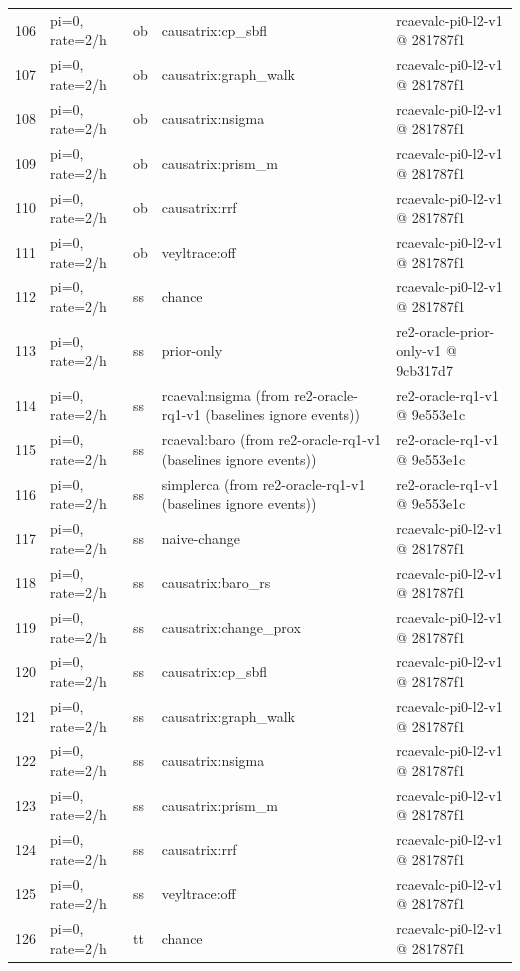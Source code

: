 \begin{longtable}{@{}r>{\raggedright\arraybackslash}p{48.0pt}>{\raggedright\arraybackslash}p{18.0pt}>{\raggedright\arraybackslash}p{108.0pt}>{\raggedright\arraybackslash}p{105.0pt}@{}}
106 & pi=0, rate=2/h & ob & causatrix:cp\_sbfl & rcaevalc-pi0-l2-v1 @ 281787f1 \\
107 & pi=0, rate=2/h & ob & causatrix:graph\_walk & rcaevalc-pi0-l2-v1 @ 281787f1 \\
108 & pi=0, rate=2/h & ob & causatrix:nsigma & rcaevalc-pi0-l2-v1 @ 281787f1 \\
109 & pi=0, rate=2/h & ob & causatrix:prism\_m & rcaevalc-pi0-l2-v1 @ 281787f1 \\
110 & pi=0, rate=2/h & ob & causatrix:rrf & rcaevalc-pi0-l2-v1 @ 281787f1 \\
111 & pi=0, rate=2/h & ob & veyltrace:off & rcaevalc-pi0-l2-v1 @ 281787f1 \\
112 & pi=0, rate=2/h & ss & chance & rcaevalc-pi0-l2-v1 @ 281787f1 \\
113 & pi=0, rate=2/h & ss & prior-only & re2-oracle-prior-only-v1 @ 9cb317d7 \\
114 & pi=0, rate=2/h & ss & rcaeval:nsigma (from re2-oracle-rq1-v1 (baselines ignore events)) & re2-oracle-rq1-v1 @ 9e553e1c \\
115 & pi=0, rate=2/h & ss & rcaeval:baro (from re2-oracle-rq1-v1 (baselines ignore events)) & re2-oracle-rq1-v1 @ 9e553e1c \\
116 & pi=0, rate=2/h & ss & simplerca (from re2-oracle-rq1-v1 (baselines ignore events)) & re2-oracle-rq1-v1 @ 9e553e1c \\
117 & pi=0, rate=2/h & ss & naive-change & rcaevalc-pi0-l2-v1 @ 281787f1 \\
118 & pi=0, rate=2/h & ss & causatrix:baro\_rs & rcaevalc-pi0-l2-v1 @ 281787f1 \\
119 & pi=0, rate=2/h & ss & causatrix:change\_prox & rcaevalc-pi0-l2-v1 @ 281787f1 \\
120 & pi=0, rate=2/h & ss & causatrix:cp\_sbfl & rcaevalc-pi0-l2-v1 @ 281787f1 \\
121 & pi=0, rate=2/h & ss & causatrix:graph\_walk & rcaevalc-pi0-l2-v1 @ 281787f1 \\
122 & pi=0, rate=2/h & ss & causatrix:nsigma & rcaevalc-pi0-l2-v1 @ 281787f1 \\
123 & pi=0, rate=2/h & ss & causatrix:prism\_m & rcaevalc-pi0-l2-v1 @ 281787f1 \\
124 & pi=0, rate=2/h & ss & causatrix:rrf & rcaevalc-pi0-l2-v1 @ 281787f1 \\
125 & pi=0, rate=2/h & ss & veyltrace:off & rcaevalc-pi0-l2-v1 @ 281787f1 \\
126 & pi=0, rate=2/h & tt & chance & rcaevalc-pi0-l2-v1 @ 281787f1 \\

\end{longtable}
